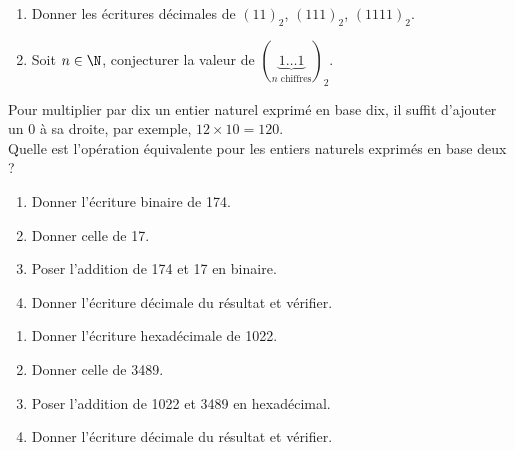 \documentclass[a4paper,12pt,french]{book}
\begin{document}
\begin{exercice}
\begin{enumerate}[--]
		\item 	Donner les écritures décimales de $(11)_2$, $(111)_2$, $(1111)_2$.
		\item   Soit $n \in \N$, conjecturer la valeur de $ \left(\underbrace{1\ldots 1}_{n \textrm{ chiffres}}\right)_2$.
\end{enumerate}
\end{exercice}

\begin{exercice}
Pour multiplier par dix un entier naturel exprimé en base dix, il suffit d'ajouter un 0 à sa
droite, par exemple, $12\times 10 = 120$.\\
Quelle est l'opération équivalente pour les entiers naturels exprimés en base deux ?
\end{exercice}

\begin{exercice}
	\begin{enumerate}[\bfseries 1.]
		\item 	Donner l'écriture binaire de 174.
		\item 	Donner celle de 17.
		\item 	Poser l'addition de 174 et 17 en binaire.
		\item 	Donner l'écriture décimale du résultat et vérifier.
	\end{enumerate}
\end{exercice}

\begin{exercice}
	\begin{enumerate}[\bfseries 1.]
		\item 	Donner l'écriture hexadécimale de 1022.
		\item 	Donner celle de 3489.
		\item 	Poser l'addition de 1022 et 3489 en hexadécimal.
		\item 	Donner l'écriture décimale du résultat et vérifier.
	\end{enumerate}
\end{exercice}
\end{document}

